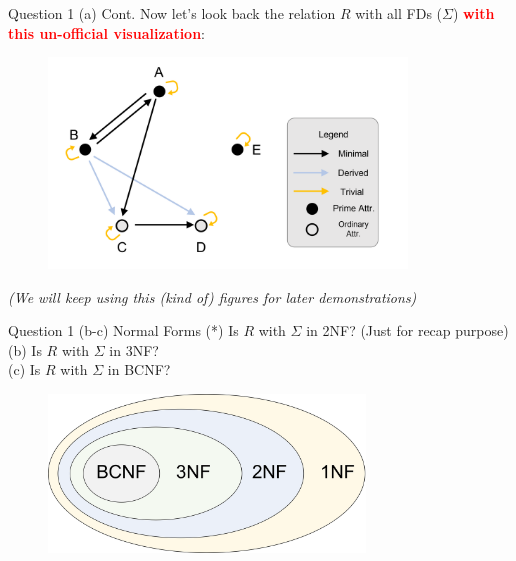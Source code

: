 \begin{frame}[fragile]{Question 1 (a) Cont.}
Now let's look back the relation $R$ with all FDs ($\Sigma$) \textcolor{red}{\textbf{with this un-official visualization}}:\\\vspace{5pt}
\begin{figure}
	\includegraphics[width=0.85\textwidth, trim=0 0 0 0, clip]{t5/images/end_q1.png}
\end{figure}

\textit{(We will keep using this (kind of) figures for later demonstrations)}
\end{frame}

\begin{frame}[fragile]{Question 1 (b-c) Normal Forms}
(*) Is $R$ with $\Sigma$ in 2NF? (Just for recap purpose)\\
(b) Is $R$ with $\Sigma$ in 3NF?\\
(c) Is $R$ with $\Sigma$ in BCNF?\\\vspace{10pt}

\begin{figure}
	\includegraphics[width=0.75\textwidth, trim=0 0 0 0, clip]{t5/images/normal_forms.png}
\end{figure}
\end{frame}

